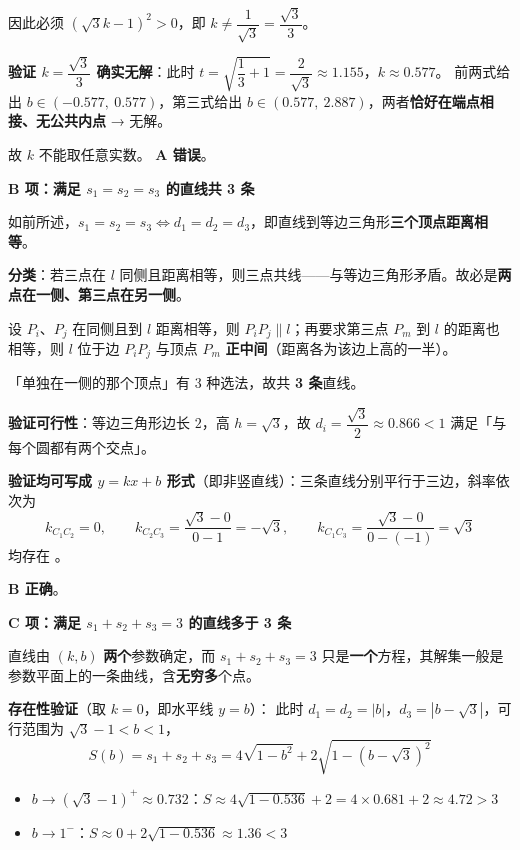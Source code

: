 \begin{answer}
因此必须 $\left(\sqrt3 k-1\right)^2>0$，即 $k\ne\dfrac{1}{\sqrt3}=\dfrac{\sqrt3}{3}$。

\textbf{验证 $k=\dfrac{\sqrt3}{3}$ 确实无解}：此时 $t=\sqrt{\dfrac13+1}=\dfrac{2}{\sqrt3}\approx1.155$，$k\approx0.577$。
前两式给出 $b\in(-0.577,\ 0.577)$，第三式给出 $b\in(0.577,\ 2.887)$，两者\textbf{恰好在端点相接、无公共内点} → 无解。

故 $k$ 不能取任意实数。 \textbf{A 错误}。

\par\medskip

\textbf{B 项：满足 $s_1=s_2=s_3$ 的直线共 3 条}

如前所述，$s_1=s_2=s_3\iff d_1=d_2=d_3$，即直线到等边三角形\textbf{三个顶点距离相等}。

\textbf{分类}：若三点在 $l$ 同侧且距离相等，则三点共线——与等边三角形矛盾。故必是\textbf{两点在一侧、第三点在另一侧}。

设 $P_i$、$P_j$ 在同侧且到 $l$ 距离相等，则 $P_iP_j\parallel l$；再要求第三点 $P_m$ 到 $l$ 的距离也相等，则 $l$ 位于边 $P_iP_j$ 与顶点 $P_m$ \textbf{正中间}（距离各为该边上高的一半）。

「单独在一侧的那个顶点」有 $3$ 种选法，故共 \textbf{3 条}直线。

\textbf{验证可行性}：等边三角形边长 $2$，高 $h=\sqrt3$，故 $d_i=\dfrac{\sqrt3}{2}\approx0.866<1$  满足「与每个圆都有两个交点」。

\textbf{验证均可写成 $y=kx+b$ 形式}（即非竖直线）：三条直线分别平行于三边，斜率依次为
\nopagebreak[4]
\[k_{C_1C_2}=0,\qquad k_{C_2C_3}=\frac{\sqrt3-0}{0-1}=-\sqrt3,\qquad k_{C_1C_3}=\frac{\sqrt3-0}{0-(-1)}=\sqrt3\]
均存在 。

 \textbf{B 正确}。

\par\medskip

\textbf{C 项：满足 $s_1+s_2+s_3=3$ 的直线多于 3 条}

直线由 $(k,b)$ \textbf{两个}参数确定，而 $s_1+s_2+s_3=3$ 只是\textbf{一个}方程，其解集一般是参数平面上的一条曲线，含\textbf{无穷多}个点。

\textbf{存在性验证}（取 $k=0$，即水平线 $y=b$）：
此时 $d_1=d_2=|b|$，$d_3=|b-\sqrt3|$，可行范围为 $\sqrt3-1<b<1$，
\nopagebreak[4]
\[S(b)=s_1+s_2+s_3=4\sqrt{1-b^2}+2\sqrt{1-(b-\sqrt3)^2}\]

\begin{itemize}
\item $b\to(\sqrt3-1)^{+}\approx0.732$：$S\approx 4\sqrt{1-0.536}+2=4\times0.681+2\approx4.72>3$
\item $b\to 1^{-}$：$S\approx 0+2\sqrt{1-0.536}\approx1.36<3$
\end{itemize}


\end{answer}
